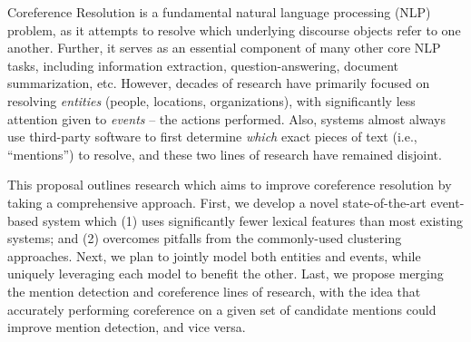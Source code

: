 
Coreference Resolution is a fundamental natural language processing (NLP) problem, as it attempts to resolve which underlying discourse objects refer to one another.  Further, it serves as an essential component of many other core NLP tasks, including information extraction, question-answering, document summarization, etc.  However, decades of research have primarily focused on resolving \textit{entities} (people, locations, organizations), with significantly less attention given to \textit{events} -- the actions performed.  Also, systems almost always use third-party software to first determine \textit{which} exact pieces of text (i.e., ``mentions'') to resolve, and these two lines of research have remained disjoint.

This proposal outlines research which aims to improve coreference resolution by taking a comprehensive approach.  First, we develop a novel state-of-the-art event-based system which (1) uses significantly fewer lexical features than most existing systems; and (2) overcomes pitfalls from the commonly-used clustering approaches.  Next, we plan to jointly model both entities and events, while uniquely leveraging each model to benefit the other.  Last, we propose merging the mention detection and coreference lines of research, with the idea that accurately performing coreference on a given set of candidate mentions could improve mention detection, and vice versa.
